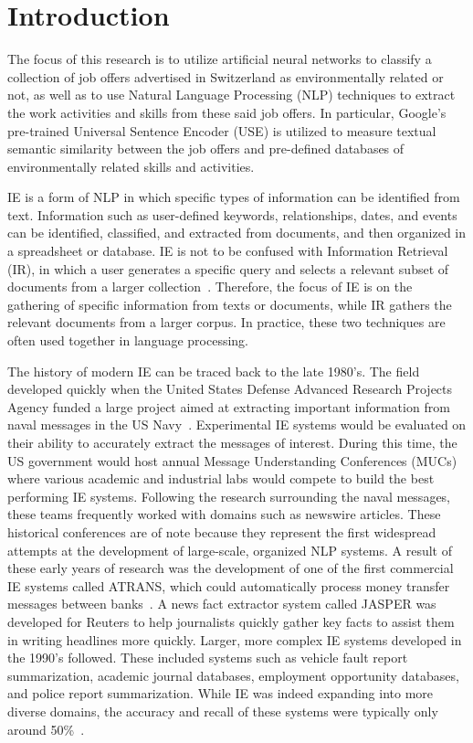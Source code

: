 \label{sec:introduction}
\chapter{Introduction}
The focus of this research is to utilize artificial neural networks to classify a collection of job offers advertised in Switzerland as environmentally related or not, as well as to use Natural Language Processing (NLP) techniques to extract the work 
activities and skills from these said job offers. In particular, Google's pre-trained Universal Sentence Encoder (USE) is utilized to measure textual semantic similarity between the job offers and pre-defined databases of environmentally related skills and activities.

IE is a form of NLP in which specific types of information can be identified from text. 
Information such as user-defined keywords, relationships, dates, and events can be identified, classified, 
and extracted from documents, and then organized in a spreadsheet or database. IE is not to be confused with 
Information Retrieval (IR), in which a user generates a specific query and selects a relevant subset of documents 
from a larger collection~\cite{gaizauskas-wilks-1998-information}. Therefore, the focus of IE is on the gathering of specific information 
from texts or documents, while IR gathers the relevant documents from a larger corpus. In practice, these
two techniques are often used together in language processing. 

The history of modern IE can be traced back to the late 1980’s. The field developed quickly when the United States
Defense Advanced Research Projects Agency funded a large project aimed at extracting important information from naval 
messages in the US Navy~\cite{grishman_2019}. Experimental IE systems would be evaluated on their ability to accurately 
extract the messages of interest. During this time, the US government would host annual Message Understanding 
Conferences (MUCs) where various academic and industrial labs would compete to build the  best performing IE systems. 
Following the research surrounding the naval messages, these teams frequently worked with domains such as newswire articles. 
These historical conferences are of note because they represent the first widespread attempts at the development of large-scale, 
organized NLP systems. A result of these early years of research was the development of one of the first commercial IE 
systems called ATRANS, which could automatically process money transfer messages between banks~\cite{gaizauskas-wilks-1998-information}. 
A news fact extractor system called JASPER was developed for Reuters to help journalists quickly gather key facts to assist 
them in writing headlines more quickly. Larger, more complex IE systems developed in the 1990’s followed. These included systems 
such as vehicle fault report summarization, academic journal databases, employment opportunity databases, and police report 
summarization. While IE was indeed expanding into more diverse domains, the accuracy and recall of these systems were 
typically only around 50\%~\cite{gaizauskas-wilks-1998-information}.


